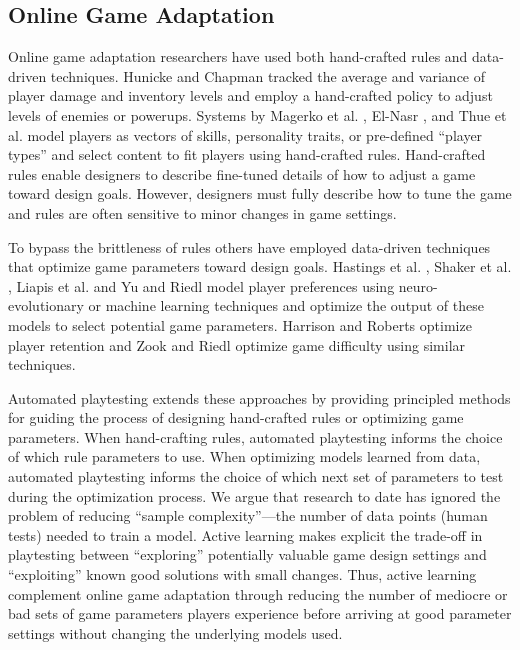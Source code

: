 \documentclass{sig-alternate}
\begin{document}
\subsection{Online Game Adaptation}
Online game adaptation researchers have used both hand-crafted rules and data-driven techniques.
Hunicke and Chapman \cite{hunicke2004:dda} tracked the average and variance of player damage and inventory levels and employ a hand-crafted policy to adjust levels of enemies or powerups. 
Systems by Magerko et al. \cite{magerko2006:isat}, El-Nasr \cite{seifel-nasr2007:mirage}, and Thue et al. \cite{thue2007:storytell-pm} model players as vectors of skills, personality traits, or pre-defined ``player types'' and select content to fit players using hand-crafted rules. %
Hand-crafted rules enable designers to describe fine-tuned details of how to adjust a game toward design goals.
However, designers must fully describe how to tune the game and rules are often sensitive to minor changes in game settings.

To bypass the brittleness of rules others have employed data-driven techniques that optimize game parameters toward design goals.
Hastings et al. \cite{hastings2009:gar}, Shaker et al. \cite{shaker2013:crowdsource-platform-aesthetics}, Liapis et al. \cite{liapis2013:rank-based-interactive-evol} and Yu and Riedl \cite{yu2013:storyeti} model player preferences using neuro-evolutionary or machine learning techniques and optimize the output of these models to select potential game parameters.
Harrison and Roberts \cite{harrison2013:scrabble-retention} optimize player retention and Zook and Riedl \cite{zook2012:tf} optimize game difficulty using similar techniques.

Automated playtesting extends these approaches by providing principled methods for guiding the process of designing hand-crafted rules or optimizing game parameters.
When hand-crafting rules, automated playtesting informs the choice of which rule parameters to use.
When optimizing models learned from data, automated playtesting informs the choice of which next set of parameters to test during the optimization process.
We argue that research to date has ignored the problem of reducing ``sample complexity''---the number of data points (human tests) needed to train a model.
Active learning makes explicit the trade-off in playtesting between ``exploring'' potentially valuable game design settings and ``exploiting'' known good solutions with small changes.
Thus, active learning complement online game adaptation through reducing the number of mediocre or bad sets of game parameters players experience before arriving at good parameter settings without changing the underlying models used.
\end{document}
